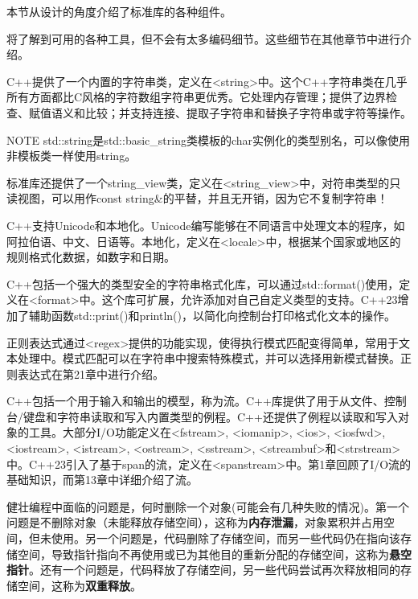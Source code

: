 
本节从设计的角度介绍了标准库的各种组件。

将了解到可用的各种工具，但不会有太多编码细节。这些细节在其他章节中进行介绍。


C++提供了一个内置的字符串类，定义在<string>中。这个C++字符串类在几乎所有方面都比C风格的字符数组字符串更优秀。它处理内存管理；提供了边界检查、赋值语义和比较；并支持连接、提取子字符串和替换子字符串或字符等操作。

\begin{myNotic}{NOTE}
std::string是std::basic\_string类模板的char实例化的类型别名，可以像使用非模板类一样使用string。
\end{myNotic}

标准库还提供了一个string\_view类，定义在<string\_view>中，对符串类型的只读视图，可以用作const string\&的平替，并且无开销，因为它不复制字符串！

C++支持Unicode和本地化。Unicode编写能够在不同语言中处理文本的程序，如阿拉伯语、中文、日语等。本地化，定义在<locale>中，根据某个国家或地区的规则格式化数据，如数字和日期。

C++包括一个强大的类型安全的字符串格式化库，可以通过std::format()使用，定义在<format>中。这个库可扩展，允许添加对自己自定义类型的支持。C++23增加了辅助函数std::print()和println()，以简化向控制台打印格式化文本的操作。


正则表达式通过<regex>提供的功能实现，使得执行模式匹配变得简单，常用于文本处理中。模式匹配可以在字符串中搜索特殊模式，并可以选择用新模式替换。正则表达式在第21章中进行介绍。


C++包括一个用于输入和输出的模型，称为流。C++库提供了用于从文件、控制台/键盘和字符串读取和写入内置类型的例程。C++还提供了例程以读取和写入对象的工具。大部分I/O功能定义在<fstream>, <iomanip>, <ios>, <iosfwd>, <iostream>, <istream>, <ostream>, <sstream>, <streambuf>和<strstream>中。C++23引入了基于span的流，定义在<spanstream>中。第1章回顾了I/O流的基础知识，而第13章中详细介绍了流。


健壮编程中面临的问题是，何时删除一个对象(可能会有几种失败的情况)。第一个问题是不删除对象（未能释放存储空间），这称为\textbf{内存泄漏}，对象累积并占用空间，但未使用。另一个问题是，代码删除了存储空间，而另一些代码仍在指向该存储空间，导致指针指向不再使用或已为其他目的重新分配的存储空间，这称为\textbf{悬空指针}。还有一个问题是，代码释放了存储空间，另一些代码尝试再次释放相同的存储空间，这称为\textbf{双重释放}。

